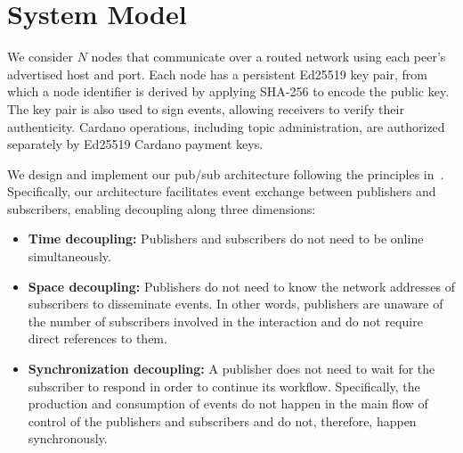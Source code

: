 \section{System Model}
\label{sec:system-model}

We consider $N$ nodes that communicate over a routed network using each peer's advertised host and port.
Each node has a persistent Ed25519 key pair, from which a node identifier is derived by applying SHA-256 to encode the public key.
The key pair is also used to sign events, allowing receivers to verify their authenticity.
Cardano operations, including topic administration, are authorized separately by Ed25519 Cardano payment keys. 

We design and implement our pub/sub architecture following the principles in~\cite{FacesOfPubSub}.
Specifically, our architecture facilitates event exchange between publishers and subscribers, enabling decoupling along three dimensions:

\begin{itemize}
    \item \textbf{Time decoupling: }Publishers and subscribers do not need to be online simultaneously.
    \item \textbf{Space decoupling: }Publishers do not need to know the network addresses of subscribers to disseminate events.
    In other words, publishers are unaware of the number of subscribers involved in the interaction and do
    not require direct references to them.
    \item \textbf{Synchronization decoupling: }A publisher does not need to wait for the subscriber to respond in order to continue its workflow.
    Specifically, the production and consumption of events do not happen in the main flow of control of the publishers and subscribers and do not, therefore, happen synchronously.
\end{itemize}

